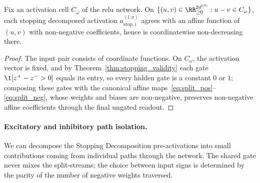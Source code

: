 \begin{lemmaenv}\label{lem:stop_monotone}
Fix an activation cell $C_\omega$ of the \ac{relu} network. On $\{(u,v)\in\RR^{2d^{(0)}}_{\ge0}:u-v\in C_\omega\}$, each stopping decomposed activation $a_{\mathrm{stop},i}^{(l,\sigma)}$ agrees with an affine function of $(u,v)$ with non-negative coefficients, hence is coordinatewise non-decreasing there.\end{lemmaenv}

\begin{proof}
The input pair consists of coordinate functions. On $C_\omega$, the activation vector is fixed, and by Theorem~\ref{thm:stopping_validity} each gate $\1[z^+-z^->0]$ equals its entry, so every hidden gate is a constant $0$ or $1$; composing these gates with the canonical affine maps~\eqref{eq:split_pos}--\eqref{eq:split_neg}, whose weights and biases are non-negative, preserves non-negative affine coefficients through the final ungated readout.
\end{proof}

\paragraph{Excitatory and inhibitory path isolation.}
We can decompose the Stopping Decomposition pre-activations into small contributions coming from individual paths through the network. The shared gate never mixes the split-streams; the choice between input signs is determined by the parity of the number of negative weights traversed.

